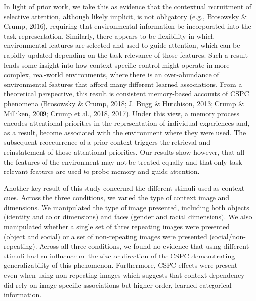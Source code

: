 \documentclass[english,,man,floatsintext]{apa6}
\begin{document}
In light of prior work, we take this as evidence that the contextual
recruitment of selective attention, although likely implicit, is not
obligatory (e.g., Brosowsky \& Crump, 2016), requiring that
environmental information be incorporated into the task representation.
Similarly, there appears to be flexibility in which environmental
features are selected and used to guide attention, which can be rapidly
updated depending on the task-relevance of those features. Such a result
lends some insight into how context-specific control might operate in
more complex, real-world environments, where there is an over-abundance
of environmental features that afford many different learned
associations. From a theoretical perspective, this result is consistent
memory-based accounts of CSPC phenomena (Brosowsky \& Crump, 2018; J.
Bugg \& Hutchison, 2013; Crump \& Milliken, 2009; Crump et al., 2018,
2017). Under this view, a memory process encodes attentional priorities
in the representation of individual experiences and, as a result, become
associated with the environment where they were used. The subsequent
reoccurrence of a prior context triggers the retrieval and reinstatement
of those attentional priorities. Our results show however, that all the
features of the environment may not be treated equally and that only
task-relevant features are used to probe memory and guide attention.

Another key result of this study concerned the different stimuli used as
context cues. Across the three conditions, we varied the type of context
image and dimensions. We manipulated the type of image presented,
including both objects (identity and color dimensions) and faces (gender
and racial dimensions). We also manipulated whether a single set of
three repeating images were presented (object and social) or a set of
non-repeating images were presented (social/non-repeating). Across all
three conditions, we found no evidence that using different stimuli had
an influence on the size or direction of the CSPC demonstrating
generalizability of this phenomenon. Furthermore, CSPC effects were
present even when using non-repeating images which suggests that
context-dependency did rely on image-specific associations but
higher-order, learned categorical information.
\end{document}
